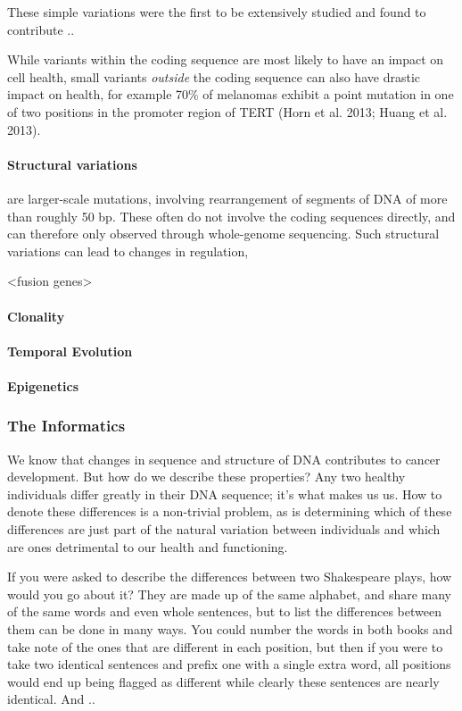 These simple variations were the first to be extensively studied and found to contribute ..

While variants within the coding sequence are most likely to have an impact on cell health, small variants \emph{outside} the coding sequence can also have drastic impact on health, for example 70\% of melanomas exhibit a point mutation in one of two positions in the promoter region of TERT (Horn et al. 2013; Huang et al. 2013).

\paragraph{Structural variations} are larger-scale mutations, involving rearrangement of segments of DNA of more than roughly 50 bp. These often do not involve the coding sequences directly, and can therefore only observed through whole-genome sequencing. Such structural variations can lead to changes in regulation,

<fusion genes>


\paragraph{Clonality}


\paragraph{Temporal Evolution}
\paragraph{Epigenetics}

\subsubsection{The Informatics}

We know that changes in sequence and structure of DNA contributes to cancer development. But how do we describe these properties? Any two healthy individuals differ greatly in their DNA sequence; it's what makes us us. How to denote these differences is a non-trivial problem, as is determining which of these differences are just part of the natural variation between individuals and which are ones detrimental to our health and functioning.

If you were asked to describe the differences between two Shakespeare plays, how would you go about it? They are made up of the same alphabet, and share many of the same words and even whole sentences, but to list the differences between them can be done in many ways. You could number the words in both books and take note of the ones that are different in each position, but then if you were to take two identical sentences and prefix one with a single extra word, all positions would end up being flagged as different while clearly these sentences are nearly identical. And ..

